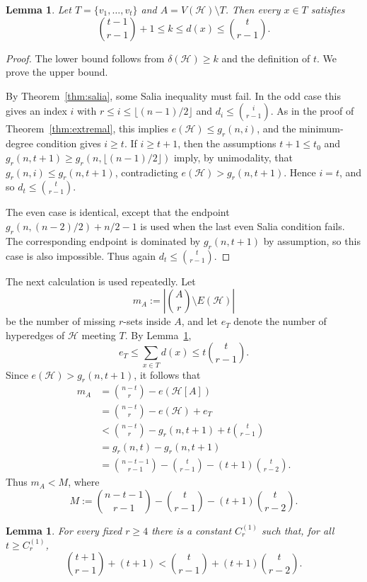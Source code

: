 \documentclass[12pt]{article}
\newtheorem{lemma}[theorem]{Lemma}
\newcommand{\Hcal}{\mathcal H}
\begin{document}
\begin{lemma}\label{lem:low-set}
Let $T=\{v_1,\ldots,v_t\}$ and $A=V(\Hcal)\setminus T$.  Then every
$x\in T$ satisfies
$$
        \binom{t-1}{r-1}+1\le k\le d(x)\le \binom{t}{r-1}.
$$
\end{lemma}

\begin{proof}
The lower bound follows from $\delta(\Hcal)\ge k$ and the definition of
$t$.  We prove the upper bound.

By Theorem~\ref{thm:salia}, some Salia inequality must fail.  In the odd
case this gives an index $i$ with
$r\le i\le \lfloor(n-1)/2\rfloor$ and
$d_i\le \binom{i}{r-1}$.  As in the proof of
Theorem~\ref{thm:extremal}, this implies
$e(\Hcal)\le g_r(n,i)$, and the minimum-degree condition gives $i\ge t$.
If $i\ge t+1$, then the assumptions $t+1\le t_0$ and
$g_r(n,t+1)\ge g_r(n,\lfloor(n-1)/2\rfloor)$ imply, by unimodality, that
$g_r(n,i)\le g_r(n,t+1)$, contradicting
$e(\Hcal)>g_r(n,t+1)$.  Hence $i=t$, and so $d_t\le\binom{t}{r-1}$.

The even case is identical, except that the endpoint
$g_r(n,(n-2)/2)+n/2-1$ is used when the last even Salia condition fails.
The corresponding endpoint is dominated by $g_r(n,t+1)$ by assumption,
so this case is also impossible.  Thus again $d_t\le\binom{t}{r-1}$.
\end{proof}

The next calculation is used repeatedly.  Let
$$
        m_A:=\left|\binom{A}{r}\setminus E(\Hcal)\right|
$$
be the number of missing $r$-sets inside $A$, and let $e_T$ denote the
number of hyperedges of $\Hcal$ meeting $T$.  By
Lemma~\ref{lem:low-set},
$$
        e_T\le \sum_{x\in T}d(x)\le t\binom{t}{r-1}.
$$
Since $e(\Hcal)>g_r(n,t+1)$, it follows that
$$
\begin{aligned}
 m_A
 &=\binom{n-t}{r}-e(\Hcal[A])\\
 &=\binom{n-t}{r}-e(\Hcal)+e_T\\
 &<\binom{n-t}{r}-g_r(n,t+1)+t\binom{t}{r-1}\\
 &=g_r(n,t)-g_r(n,t+1)\\
 &=\binom{n-t-1}{r-1}
   -\binom{t}{r-1}
   -(t+1)\binom{t}{r-2}.
\end{aligned}
$$
Thus $m_A<M$, where
\begin{equation}\label{eq:missing-A}
M:=
\binom{n-t-1}{r-1}
-\binom{t}{r-1}
-(t+1)\binom{t}{r-2}.
\end{equation}

\begin{lemma}\label{lem:t-large-ineq}
For every fixed $r\ge4$ there is a constant $C_r^{(1)}$ such that, for
all $t\ge C_r^{(1)}$,
$$
        \binom{t+1}{r-1}+(t+1)
        <
        \binom{t}{r-1}+(t+1)\binom{t}{r-2}.
$$
\end{lemma}
\end{document}
